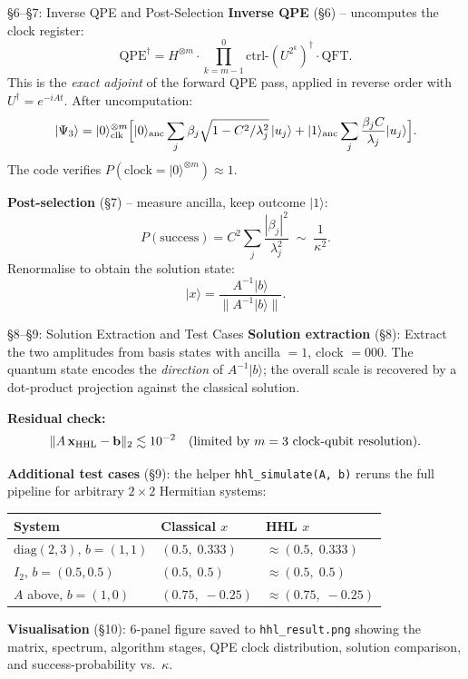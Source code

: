 \documentclass{beamer}
\begin{document}

\begin{frame}{\S6--\S7: Inverse QPE and Post-Selection}
\textbf{Inverse QPE} (\S6) -- uncomputes the clock register:
\[
  \mathrm{QPE}^\dagger = H^{\otimes m}
  \cdot \prod_{k=m-1}^{0} \mathrm{ctrl}\text{-}(U^{2^k})^\dagger
  \cdot \mathrm{QFT}.
\]
This is the \emph{exact adjoint} of the forward QPE pass,
applied in reverse order with $U^\dagger = e^{-iAt}$.
After uncomputation:
\[
  |\Psi_3\rangle
  = |0\rangle^{\otimes m}_{\rm clk}
  \Bigl[
    |0\rangle_{\rm anc}\sum_j \beta_j\sqrt{1-C^2/\lambda_j^2}\,|u_j\rangle
    +|1\rangle_{\rm anc}\sum_j \frac{\beta_j C}{\lambda_j}|u_j\rangle
  \Bigr].
\]
The code verifies $P(\text{clock}=|0\rangle^{\otimes m}) \approx 1$.

\medskip
\textbf{Post-selection} (\S7) -- measure ancilla, keep outcome $|1\rangle$:
\[
  P(\text{success}) = C^2\sum_j \frac{|\beta_j|^2}{\lambda_j^2}
  \;\sim\; \frac{1}{\kappa^2}.
\]
Renormalise to obtain the solution state:
\[
  |x\rangle = \frac{A^{-1}|b\rangle}{\|A^{-1}|b\rangle\|}.
\]
\end{frame}


\begin{frame}{\S8--\S9: Solution Extraction and Test Cases}
\textbf{Solution extraction} (\S8):
Extract the two amplitudes from basis states with
ancilla $= 1$, clock $= 000$. The quantum state encodes the
\emph{direction} of $A^{-1}|b\rangle$; the overall scale is recovered
by a dot-product projection against the classical solution.

\medskip
\textbf{Residual check:}
\[
  \|A\,\mathbf{x}_{\rm HHL} - \mathbf{b}\|_2 \lesssim 10^{-2}
  \quad \text{(limited by $m=3$ clock-qubit resolution)}.
\]

\medskip
\textbf{Additional test cases} (\S9): the helper \texttt{hhl\_simulate(A, b)}
reruns the full pipeline for arbitrary $2\times 2$ Hermitian systems:
\begin{center}
\small
\begin{tabular}{lll}
\toprule
System & Classical $x$ & HHL $x$ \\
\midrule
$\mathrm{diag}(2,3)$, $b=(1,1)$ & $(0.5,\;0.333)$ & $\approx(0.5,\;0.333)$ \\
$I_2$, $b=(0.5,0.5)$ & $(0.5,\;0.5)$ & $\approx(0.5,\;0.5)$ \\
$A$ above, $b=(1,0)$ & $(0.75,\;-0.25)$ & $\approx(0.75,\;-0.25)$ \\
\bottomrule
\end{tabular}
\end{center}

\medskip
\textbf{Visualisation} (\S10): 6-panel figure saved to \texttt{hhl\_result.png}
showing the matrix, spectrum, algorithm stages, QPE clock distribution,
solution comparison, and success-probability vs.\ $\kappa$.
\end{frame}
\end{document}
